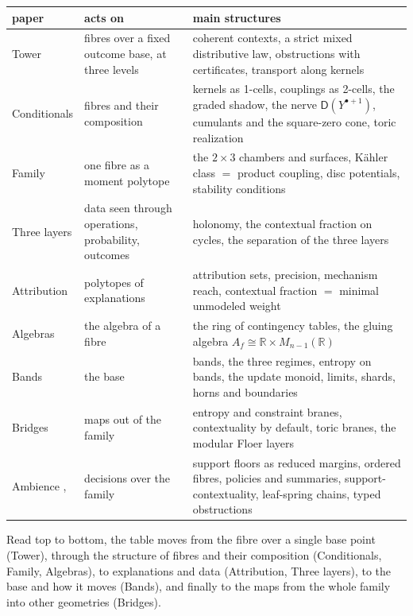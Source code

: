 \documentclass[11pt]{article}
\theoremstyle{definition}
\theoremstyle{remark}
\newcommand{\D}{\mathsf{D}}
\newcommand{\R}{\mathbb{R}}
\begin{document}
\begin{center}
\small
\begin{tabular}{p{2.6cm}p{5.6cm}p{6.6cm}}
\toprule
paper & acts on & main structures\\
\midrule
Tower \cite{Tower} & fibres over a fixed outcome base, at three levels & coherent contexts, a strict mixed distributive law, obstructions with certificates, transport along kernels\\
Conditionals \cite{Conditionals} & fibres and their composition & kernels as 1-cells, couplings as 2-cells, the graded shadow, the nerve $\D(Y^{\bullet+1})$, cumulants and the square-zero cone, toric realization\\
Family \cite{Family} & one fibre as a moment polytope & the $2\times3$ chambers and surfaces, Kähler class $=$ product coupling, disc potentials, stability conditions\\
Three layers \cite{ThreeLayers} & data seen through operations, probability, outcomes & holonomy, the contextual fraction on cycles, the separation of the three layers\\
Attribution \cite{Attribution} & polytopes of explanations & attribution sets, precision, mechanism reach, contextual fraction $=$ minimal unmodeled weight\\
Algebras \cite{Algebras} & the algebra of a fibre & the ring of contingency tables, the gluing algebra $A_f\cong\R\times M_{n-1}(\R)$\\
Bands \cite{Bands} & the base & bands, the three regimes, entropy on bands, the update monoid, limits, shards, horns and boundaries\\
Bridges \cite{Bridges} & maps out of the family & entropy and constraint branes, contextuality by default, toric branes, the modular Floer layers\\
Ambience \cite[\S10.7]{Tower}, \cite[\S3, \S4]{Conditionals} & decisions over the family & support floors as reduced margins, ordered fibres, policies and summaries, support-contextuality, leaf-spring chains, typed obstructions \cite[Section~14]{Validation}\\
\bottomrule
\end{tabular}
\end{center}

Read top to bottom, the table moves from the fibre over a single base point (Tower), through the structure of fibres and their composition
(Conditionals, Family, Algebras), to explanations and data (Attribution, Three layers), to the base and how it moves (Bands), and finally to
the maps from the whole family into other geometries (Bridges).
\end{document}
